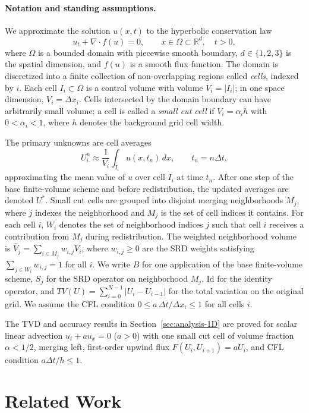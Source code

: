 \documentclass[11pt]{article}
\begin{document}
\paragraph{Notation and standing assumptions.}
We approximate the solution $u(x,t)$ to the hyperbolic conservation law
\[
  u_t + \nabla \cdot f(u) = 0, \qquad x \in \Omega \subset \mathbb{R}^d,
  \quad t > 0,
\]
where $\Omega$ is a bounded domain with piecewise smooth boundary,
$d \in \{1, 2, 3\}$ is the spatial dimension, and $f(u)$ is a smooth flux
function. The domain is discretized into a finite collection of
non-overlapping regions called \emph{cells}, indexed by $i$. Each cell
$I_i \subset \Omega$ is a control volume with volume $V_i = |I_i|$; in one
space dimension, $V_i = \Delta x_i$. Cells intersected by the domain
boundary can have arbitrarily small volume; a cell is called a \emph{small
cut cell} if $V_i = \alpha_i h$ with $0 < \alpha_i < 1$, where $h$ denotes
the background grid cell width.

The primary unknowns are cell averages
\[
  U_i^n \approx \frac{1}{V_i}\int_{I_i} u(x,t_n)\,dx, \qquad t_n = n\Delta t,
\]
approximating the mean value of $u$ over cell $I_i$ at time $t_n$. After
one step of the base finite-volume scheme and before redistribution, the
updated averages are denoted $U^*$. Small cut cells are grouped into
disjoint merging neighborhoods $M_j$, where $j$ indexes the neighborhood
and $M_j$ is the set of cell indices it contains. For each cell $i$, $W_i$
denotes the set of neighborhood indices $j$ such that cell $i$ receives a
contribution from $M_j$ during redistribution. The weighted neighborhood
volume is $\hat{V}_j = \sum_{i \in M_j} w_{i,j} V_i$, where $w_{i,j} \ge
0$ are the SRD weights satisfying $\sum_{j \in W_i} w_{i,j} = 1$ for all
$i$. We write $B$ for one application of the base finite-volume scheme,
$S_j$ for the SRD operator on neighborhood $M_j$, $\mathrm{Id}$ for the
identity operator, and $TV(U) = \sum_{i=0}^{N-1} |U_i - U_{i-1}|$ for the
total variation on the original grid. We assume the CFL condition $0 \le
a\,\Delta t / \Delta x_i \le 1$ for all cells $i$.

The TVD and accuracy results in Section~\ref{sec:analysis-1D} are proved
for scalar linear advection $u_t + au_x = 0$ ($a > 0$) with one small cut
cell of volume fraction $\alpha < 1/2$, merging left, first-order upwind
flux $F(U_i, U_{i+1}) = aU_i$, and CFL condition $a\Delta t/h \le 1$.%
\section{Related Work}
\end{document}
